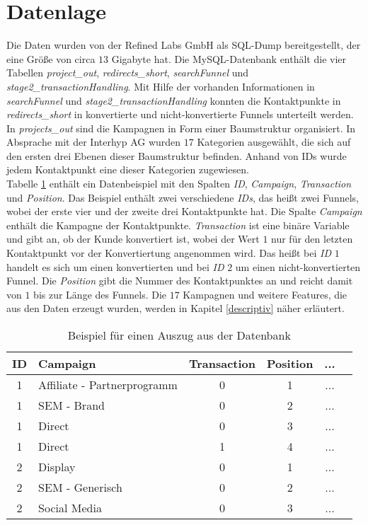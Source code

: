 \section{Datenlage}\label{datenlage}

Die Daten wurden von der Refined Labs GmbH als SQL-Dump bereitgestellt, der eine Größe von circa $13$ Gigabyte hat. Die MySQL-Datenbank enthält die vier Tabellen \textit{project\_out}, \textit{redirects\_short}, \textit{searchFunnel} und \textit{stage2\_transactionHandling}. Mit Hilfe der vorhanden Informationen in \textit{searchFunnel} und \textit{stage2\_transactionHandling} konnten die Kontaktpunkte in \textit{redirects\_short} in konvertierte und nicht-konvertierte Funnels unterteilt werden. In \textit{projects\_out} sind die Kampagnen in Form einer Baumstruktur organisiert. In Absprache mit der Interhyp AG wurden $17$ Kategorien ausgewählt, die sich auf den ersten drei Ebenen dieser Baumstruktur befinden. Anhand von IDs wurde jedem Kontaktpunkt eine dieser Kategorien zugewiesen.\\
Tabelle \ref{exdata} enthält ein Datenbeispiel mit den Spalten \textit{ID}, \textit{Campaign}, \textit{Transaction} und \textit{Position}. Das Beispiel enthält zwei verschiedene \textit{IDs}, das heißt zwei Funnels, wobei der erste vier und der zweite drei Kontaktpunkte hat. Die Spalte \textit{Campaign} enthält die Kampagne der Kontaktpunkte. \textit{Transaction} ist eine binäre Variable und gibt an, ob der Kunde konvertiert ist, wobei der Wert $1$ nur für den letzten Kontaktpunkt vor der Konvertiertung angenommen wird. Das heißt bei \textit{ID} $1$ handelt es sich um einen konvertierten und bei \textit{ID} $2$ um einen nicht-konvertierten Funnel. Die \textit{Position} gibt die Nummer des Kontaktpunktes an und reicht damit von $1$ bis zur Länge des Funnels. Die $17$ Kampagnen und weitere Features, die aus den Daten erzeugt wurden, werden in Kapitel \ref{descriptiv} näher erläutert.\\
\begin{table}[H]
	\begin{center}
		\begin{tabular}{|c|l|c|c|c|c|}
			\hline
			ID & Campaign 									 & Transaction & Position & ... \\ \hline\hline
			1  & Affiliate - Partnerprogramm & 0					 & 1		    & ... \\ \hline
			1  & SEM - Brand                 & 0					 & 2		    & ... \\ \hline
			1  & Direct                      & 0					 & 3		    & ... \\ \hline
			1  & Direct                      & 1					 & 4		    & ... \\ \hline
			2  & Display                     & 0					 & 1		    & ... \\ \hline
			2  & SEM - Generisch             & 0					 & 2		    & ... \\ \hline
			2  & Social Media                & 0					 & 3		    & ... \\ \hline
		\end{tabular} 
	\end{center}
	\caption{Beispiel für einen Auszug aus der Datenbank}\label{exdata}
\end{table}
